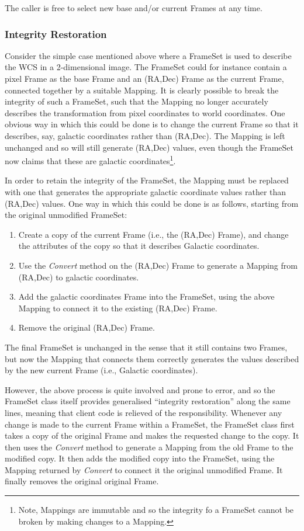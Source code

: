 \documentclass[final,authoryear,5p,times,twocolumn]{elsarticle}
\begin{document}
The caller is free to select new base and/or current Frames at any time.

\subsubsection{Integrity Restoration}
\label{sec:integrity}
Consider the simple case mentioned above where a FrameSet is used to
describe the WCS in a 2-dimensional image. The FrameSet could for
instance contain a pixel Frame as the base Frame and an (RA,Dec) Frame as
the current Frame, connected together by a suitable Mapping. It is
clearly possible to break the integrity of such a FrameSet, such that the
Mapping no longer accurately describes the transformation from pixel
coordinates to world coordinates. One obvious way in which this could be
done is to change the current Frame so that it describes, say, galactic
coordinates rather than (RA,Dec). The Mapping is left unchanged and so will
still generate (RA,Dec) values, even though the FrameSet now claims that
these are galactic coordinates\footnote{Note, Mappings are immutable and so the
integrity fo a FrameSet cannot be broken by making changes to a Mapping.}.

In order to retain the integrity of the FrameSet, the Mapping must
be replaced with one that generates the appropriate galactic coordinate
values rather than (RA,Dec) values. One way in which this could be done is as
follows, starting from the original unmodified FrameSet:

\begin{enumerate}
\item Create a copy of the current Frame (i.e., the (RA,Dec) Frame), and
change the attributes of the copy so that it describes Galactic
coordinates.
\item Use the \emph{Convert} method on the (RA,Dec) Frame to generate a
Mapping from (RA,Dec) to galactic coordinates.
\item Add the galactic coordinates Frame into the FrameSet, using the
above Mapping to connect it to the existing (RA,Dec) Frame.
\item Remove the original (RA,Dec) Frame.
\end{enumerate}

The final FrameSet is unchanged in the sense that it still contains two
Frames, but now the Mapping that connects them correctly generates the values
described by the new current Frame (i.e., Galactic coordinates).

However, the above process is quite involved and prone to error, and so
the FrameSet class itself provides generalised ``integrity restoration''
along the same lines, meaning that client code is relieved of the
responsibility. Whenever any change is made to the current Frame within a
FrameSet, the FrameSet class first takes a copy of the original Frame and
makes the requested change to the copy. It then uses the \emph{Convert}
method to generate a Mapping from the old Frame to the modified copy. It
then adds the modified copy into the FrameSet, using the Mapping returned
by \emph{Convert} to connect it the original unmodified Frame. It finally
removes the original original Frame.
\end{document}
